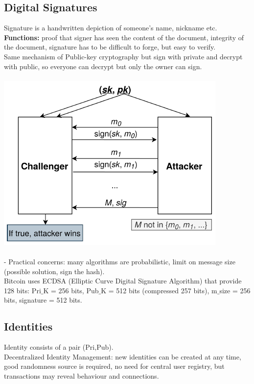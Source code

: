 \documentclass{article}
\begin{document}
\subsection{Digital Signatures}
Signature is a handwritten depiction of someone's name, nickname etc.\\
\textbf{Functions:} proof that signer has seen the content of the document, integrity of the document, signature has to be difficult to forge, but easy to verify.\\
Same mechanism of Public-key cryptography but sign with private and decrypt with public, so everyone can decrypt but only the owner can sign.\\\\
\includegraphics[scale=0.8]{5.png}\\\\
- Practical concerns: many algorithms are probabilistic, limit on message size (possible solution, sign the hash).\\
Bitcoin uses ECDSA (Elliptic Curve Digital Signature Algorithm) that provide 128 bits: Pri$\_$K = 256 bits, Pub$\_$K = 512 bits (compressed 257 bits), m$\_$size = 256 bits, signature = 512 bits.\\

\subsection{Identities}
Identity consists of a pair (Pri,Pub).\\
Decentralized Identity Management: new identities can be created at any time, good randomness source is required, no need for central user registry, but transactions may reveal behaviour and connections.\\
\end{document}
